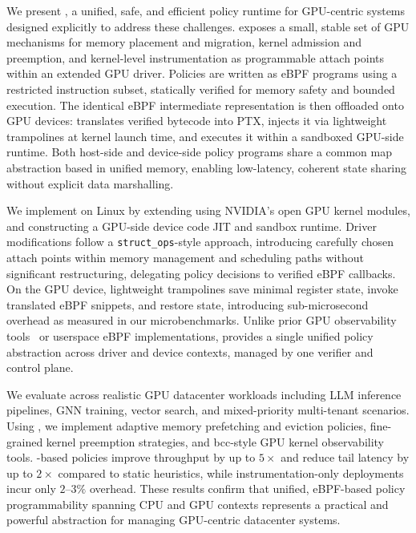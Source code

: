 We present \sys, a unified, safe, and efficient policy runtime for GPU-centric systems designed explicitly to address these challenges. \sys exposes a small, stable set of GPU mechanisms for memory placement and migration, kernel admission and preemption, and kernel-level instrumentation as programmable attach points within an extended GPU driver. Policies are written as eBPF programs using a restricted instruction subset, statically verified for memory safety and bounded execution. The identical eBPF intermediate representation is then offloaded onto GPU devices: \sys translates verified bytecode into PTX, injects it via lightweight trampolines at kernel launch time, and executes it within a sandboxed GPU-side runtime. Both host-side and device-side policy programs share a common map abstraction based in unified memory, enabling low-latency, coherent state sharing without explicit data marshalling.

We implement \sys on Linux by extending \sysdriver using NVIDIA's open GPU kernel modules\cite{}, and constructing a GPU-side device code JIT and sandbox runtime. Driver modifications follow a \texttt{struct\_ops}-style approach, introducing carefully chosen attach points within memory management and scheduling paths without significant restructuring, delegating policy decisions to verified eBPF callbacks. On the GPU device, lightweight trampolines save minimal register state, invoke translated eBPF snippets, and restore state, introducing sub-microsecond overhead as measured in our microbenchmarks. Unlike prior GPU observability tools~\cite{cupti,villa2019nvbit,neutrino,eGPU} or userspace eBPF implementations, \sys provides a single unified policy abstraction across driver and device contexts, managed by one verifier and control plane.

We evaluate \sys across realistic GPU datacenter workloads including LLM inference pipelines, GNN training, vector search, and mixed-priority multi-tenant scenarios. Using \sys, we implement adaptive memory prefetching and eviction policies, fine-grained kernel preemption strategies, and bcc-style GPU kernel observability tools. \sys-based policies improve throughput by up to $5\times$ and reduce tail latency by up to $2\times$ compared to static heuristics, while instrumentation-only deployments incur only $2$–$3\%$ overhead. These results confirm that unified, eBPF-based policy programmability spanning CPU and GPU contexts represents a practical and powerful abstraction for managing GPU-centric datacenter systems.

